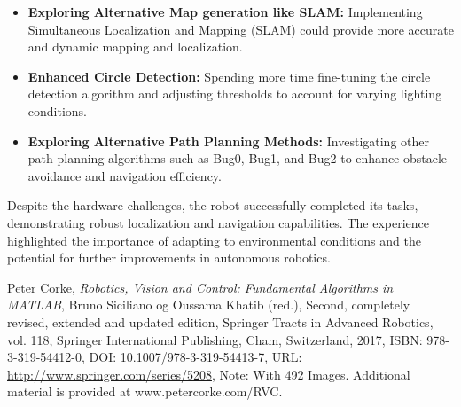 \documentclass{article}
\begin{document}
	\begin{itemize}
		\item \textbf{Exploring Alternative Map generation like SLAM:} Implementing Simultaneous Localization and Mapping (SLAM) could provide more accurate and dynamic mapping and localization.
		\item \textbf{Enhanced Circle Detection:} Spending more time fine-tuning the circle detection algorithm and adjusting thresholds to account for varying lighting conditions.
		\item \textbf{Exploring Alternative Path Planning Methods:} Investigating other path-planning algorithms such as Bug0, Bug1, and Bug2 to enhance obstacle avoidance and navigation efficiency.
	\end{itemize}
	Despite the hardware challenges, the robot successfully completed its tasks, demonstrating robust localization and navigation capabilities. The experience highlighted the importance of adapting to environmental conditions and the potential for further improvements in autonomous robotics.
	\begin{thebibliography}{9}
		
		Peter Corke,
		\textit{Robotics, Vision and Control: Fundamental Algorithms in MATLAB},
		Bruno Siciliano og Oussama Khatib (red.),
		Second, completely revised, extended and updated edition,
		Springer Tracts in Advanced Robotics, vol. 118,
		Springer International Publishing, Cham, Switzerland,
		2017,
		ISBN: 978-3-319-54412-0,
		DOI: 10.1007/978-3-319-54413-7,
		URL: \url{http://www.springer.com/series/5208},
		Note: With 492 Images. Additional material is provided at www.petercorke.com/RVC.
		
	\end{thebibliography}
	
	
	
	\clearpage
	\appendix
\end{document}

